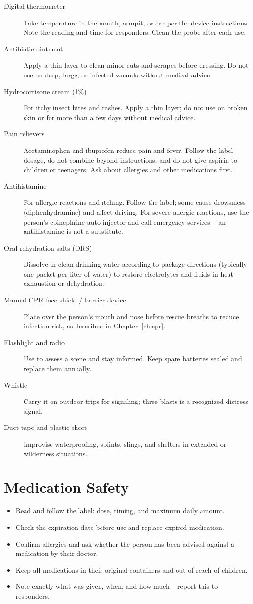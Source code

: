 \begin{description}
  \item[Digital thermometer] Take temperature in the mouth, armpit, or ear per the device instructions. Note the reading and time for responders. Clean the probe after each use.
  \item[Antibiotic ointment] Apply a thin layer to clean minor cuts and scrapes before dressing. Do not use on deep, large, or infected wounds without medical advice.
  \item[Hydrocortisone cream (1\%)] For itchy insect bites and rashes. Apply a thin layer; do not use on broken skin or for more than a few days without medical advice.
  \item[Pain relievers] Acetaminophen and ibuprofen reduce pain and fever. Follow the label dosage, do not combine beyond instructions, and do not give aspirin to children or teenagers. Ask about allergies and other medications first.
  \item[Antihistamine] For allergic reactions and itching. Follow the label; some cause drowsiness (diphenhydramine) and affect driving. For severe allergic reactions, use the person's epinephrine auto-injector and call emergency services -- an antihistamine is not a substitute.
  \item[Oral rehydration salts (ORS)] Dissolve in clean drinking water according to package directions (typically one packet per liter of water) to restore electrolytes and fluids in heat exhaustion or dehydration.
  \item[Manual CPR face shield / barrier device] Place over the person's mouth and nose before rescue breaths to reduce infection risk, as described in Chapter~\ref{ch:cpr}.
  \item[Flashlight and radio] Use to assess a scene and stay informed. Keep spare batteries sealed and replace them annually.
  \item[Whistle] Carry it on outdoor trips for signaling; three blasts is a recognized distress signal.
  \item[Duct tape and plastic sheet] Improvise waterproofing, splints, slings, and shelters in extended or wilderness situations.
\end{description}

\section{Medication Safety}

\begin{itemize}[leftmargin=*]
  \item Read and follow the label: dose, timing, and maximum daily amount.
  \item Check the expiration date before use and replace expired medication.
  \item Confirm allergies and ask whether the person has been advised against a medication by their doctor.
  \item Keep all medications in their original containers and out of reach of children.
  \item Note exactly what was given, when, and how much -- report this to responders.
\end{itemize}

